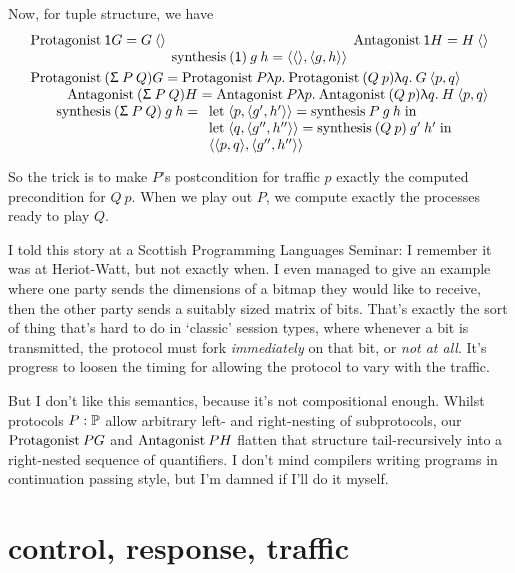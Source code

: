 \documentclass{book}
\newcommand{\C}[1]{\red{\ensuremath{\mathsf{#1}}}}
\newcommand{\N}[1]{\black{\ensuremath{#1}}}
\newcommand{\lett}[3]{\mathrm{let}\;#1 = #2\;\mathrm{in}\; #3}
\newcommand{\lam}[2]{\red{\uplambda} #1.\:#2}
\newcommand{\vd}{\C{\langle\rangle}}
\newcommand{\pr}[2]{\red{\langle\N{#1},\N{#2}\rangle}}
\begin{document}
Now, for tuple structure, we have
\[\begin{array}{l@{\qquad}r}
\Play{\C{1}}{G} = G\:\vd &
\Oppo{\C{1}}{H} = H\:\vd \\
\multicolumn{2}{c}{
  \interact{(\C{1})}{g}{h} = \pr{\vd}{\pr{g}{h}}
  } \smallskip \\
\multicolumn{2}{l}{\Play{(\Sg{P}{Q})}{G} = \Play{P}{\lam{p}{\Play{(Q\:p)}{\lam{q}{G\:\pr{p}{q}}}}}\qquad}\\
\multicolumn{2}{r}{\Oppo{(\Sg{P}{Q})}{H} = \Oppo{P}{\lam{p}{\Oppo{(Q\:p)}{\lam{q}{H\:\pr{p}{q}}}}}}\\
\multicolumn{2}{c}{
  \interact{(\Sg{P}{Q})}{g}{h} =
  \begin{array}[t]{l}
  \lett{\pr{p}{\pr{g'}{h'}}}
       {\interact{P}{g}{h}}
       {\\ \lett{\pr{q}{\pr{g''}{h''}}}
         {\interact{(Q\:p)}{g'}{h'}}
         {\\ \pr{\pr{p}{q}}{\pr{g''}{h''}}}
       }
       \end{array}
  } \smallskip \\
\end{array}\]
So the trick is to make $P$'s postcondition for traffic $p$ exactly the computed precondition for $Q\:p$. When we play out $P$, we compute exactly the processes ready to play $Q$.

I told this story at a Scottish Programming Languages Seminar: I remember it was at Heriot-Watt, but not exactly when. I even managed to give an example where one party sends the dimensions of a bitmap they would like to receive, then the other party sends a suitably sized matrix of bits. That's exactly the sort of thing that's hard to do in `classic' session types, where whenever a bit is transmitted, the protocol must fork \emph{immediately} on that bit, or \emph{not at all}. It's progress to loosen the timing for allowing the protocol to vary with the traffic.

But I don't like this semantics, because it's not compositional enough. Whilst protocols $P:\Protocol$ allow arbitrary left- and right-nesting of subprotocols, our $\Play{P}{G}$ and $\Oppo{P}{H}$ flatten that structure tail-recursively into a right-nested sequence of quantifiers. I don't mind compilers writing programs in continuation passing style, but I'm damned if I'll do it myself.


\section{control, response, traffic}
\end{document}
